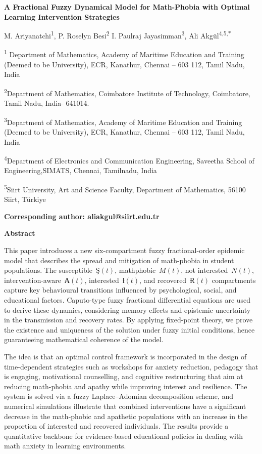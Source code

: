 \documentclass[
]{article}
\author{}
\date{}
\begin{document}
\textbf{A Fractional Fuzzy Dynamical Model for Math-Phobia with Optimal Learning Intervention Strategies}

M. Ariyanatchi\textsuperscript{1}, P. Roselyn Besi\textsuperscript{2} I. Paulraj Jayasimman\textsuperscript{3}, Ali Akgül\textsuperscript{4,5,*}

\textsuperscript{1} Department of Mathematics, Academy of Maritime Education and Training (Deemed to be University), ECR, Kanathur, Chennai -- 603 112, Tamil Nadu, India

\textsuperscript{2}Department of Mathematics, Coimbatore Institute of Technology, Coimbatore, Tamil Nadu, India- 641014.

\textsuperscript{3}Department of Mathematics, Academy of Maritime Education and Training (Deemed to be University), ECR, Kanathur, Chennai -- 603 112, Tamil Nadu, India

\textsuperscript{4}Department of Electronics and Communication Engineering, Saveetha School of Engineering,SIMATS, Chennai, Tamilnadu, India

\textsuperscript{5}Siirt University, Art and Science Faculty, Department of Mathematics, 56100 Siirt, Türkiye

\textbf{Corresponding author: aliakgul@siirt.edu.tr}

\textbf{Abstract}

This paper introduces a new six-compartment fuzzy fractional-order epidemic model that describes the spread and mitigation of math-phobia in student populations. The susceptible~\(Ş(t)\), mathphobic~\(M(t)\), not interested~\(N(t)\), intervention-aware~\(₳(t)\), interested~\(ƚ(t)\), and recovered~\(Ɍ(t)\) compartments capture key behavioural transitions influenced by psychological, social, and educational factors. Caputo-type fuzzy fractional differential equations are used to derive these dynamics, considering memory effects and epistemic uncertainty in the transmission and recovery rates. By applying fixed-point theory, we prove the existence and uniqueness of the solution under fuzzy initial conditions, hence guaranteeing mathematical coherence of the model.

The idea is that an optimal control framework is incorporated in the design of time-dependent strategies such as workshops for anxiety reduction, pedagogy that is engaging, motivational counselling, and cognitive restructuring that aim at reducing math-phobia and apathy while improving interest and resilience. The system is solved via a fuzzy Laplace--Adomian decomposition scheme, and numerical simulations illustrate that combined interventions have a significant decrease in the math-phobic and apathetic populations with an increase in the proportion of interested and recovered individuals. The results provide a quantitative backbone for evidence-based educational policies in dealing with math anxiety in learning environments.
\end{document}
